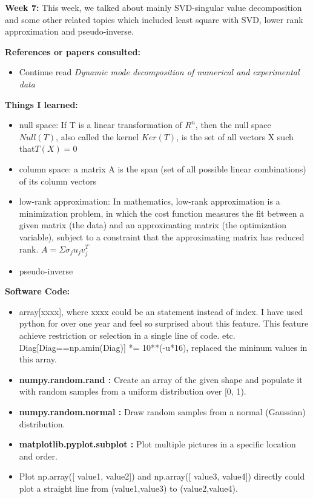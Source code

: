 \documentclass{article}
\begin{document}
\newpage
\textbf{Week 7:}
This week, we talked about mainly SVD-singular value decomposition and some other related topics which included least square with SVD, lower rank approximation and pseudo-inverse. 

\textbf{References or papers consulted:}
\begin{itemize}

\item Continue read {\em Dynamic mode decomposition of numerical and experimental data}

\end{itemize}

\textbf{Things I learned:}
\begin{itemize}
\item null space: If T is a linear transformation of $R^n$, then the null space $Null(T)$, also called the kernel $Ker(T)$, is the set of all vectors X such that$ T(X) = 0$
\item column space: a matrix A is the span (set of all possible linear combinations) of its column vectors
\item low-rank approximation: In mathematics, low-rank approximation is a minimization problem, in which the cost function measures the fit between a given matrix (the data) and an approximating matrix (the optimization variable), subject to a constraint that the approximating matrix has reduced rank. $A = \Sigma \sigma_j u_j v_j^T $
\item pseudo-inverse


\end{itemize}

\textbf{Software Code:}
\begin{itemize}
\item  array[xxxx], where xxxx could be an statement instead of index. I have used python for over one year and feel so surprised about this feature. This feature achieve restriction or selection in a single line of code. etc. Diag[Diag==np.amin(Diag)] *= 10**(-u*16), replaced the mininum values in this array.
\item \textbf{numpy.random.rand :} Create an array of the given shape and populate it with random samples from a uniform distribution over [0, 1).
\item \textbf{numpy.random.normal :} Draw random samples from a normal (Gaussian) distribution.
\item \textbf{matplotlib.pyplot.subplot :} Plot multiple pictures in a specific location and order.
\item Plot np.array([ value1, value2]) and  np.array([ value3, value4]) directly could plot a straight line from (value1,value3) to (value2,value4).
\end{itemize}
\end{document}
